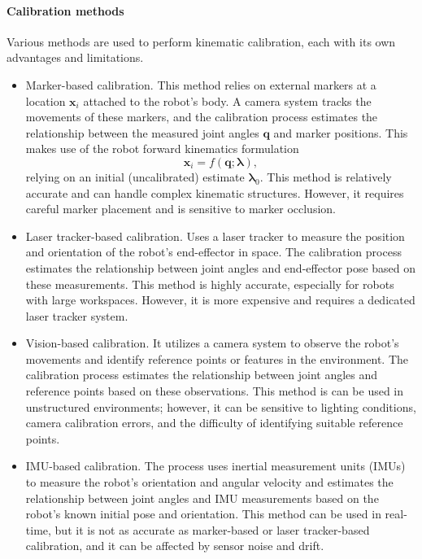 \paragraph*{Calibration methods} Various methods are used to perform kinematic calibration, each with its own advantages and limitations.
\begin{itemize}
	\item Marker-based calibration.  This method relies on external markers at a location $\bm{x}_i$ attached to the robot's body. A camera system tracks the movements of these markers, and the calibration process estimates the relationship between the measured joint angles $\bm{q}$ and marker positions. This makes use of the robot forward kinematics formulation
	\begin{equation}
		\bm{x}_i = f\left(\bm{q};\bm{\lambda}\right),
	\end{equation}
	relying on an initial (uncalibrated) estimate $\bm{\lambda}_0$. This method is relatively accurate and can handle complex kinematic structures. However, it requires careful marker placement and is sensitive to marker occlusion.
	\item Laser tracker-based calibration. Uses a laser tracker to measure the position and orientation of the robot's end-effector in space. The calibration process estimates the relationship between joint angles and end-effector pose based on these measurements. This method is highly accurate, especially for robots with large workspaces. However, it is more expensive and requires a dedicated laser tracker system.
	\item Vision-based calibration. It utilizes a camera system to observe the robot's movements and identify reference points or features in the environment. The calibration process estimates the relationship between joint angles and reference points based on these observations. This method is can be used in unstructured environments; however, it can be sensitive to lighting conditions, camera calibration errors, and the difficulty of identifying suitable reference points.
	\item IMU-based calibration. The process uses inertial measurement units (IMUs) to measure the robot's orientation and angular velocity and estimates the relationship between joint angles and IMU measurements based on the robot's known initial pose and orientation. This method can be used in real-time, but it is not as accurate as marker-based or laser tracker-based calibration, and it can be affected by sensor noise and drift.	
\end{itemize}

